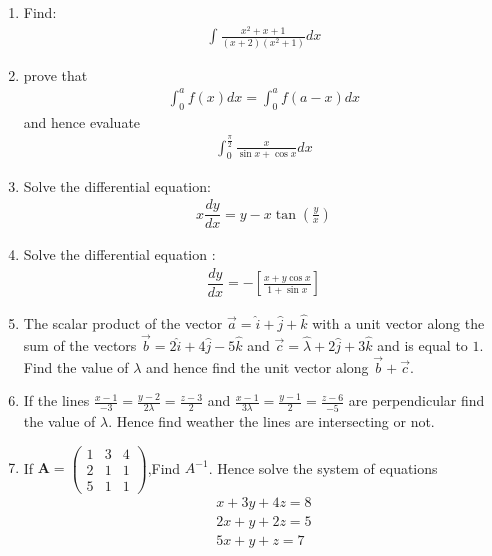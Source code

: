 \documentclass[12pt,-letter paper]{article}
\providecommand{\sbrak}[1]{\ensuremath{{}\left[#1\right]}}
\providecommand{\brak}[1]{\ensuremath{\left(#1\right)}}
\theoremstyle{remark}
\newcommand{\myvec}[1]{\ensuremath{\begin{pmatrix}#1\end{pmatrix}}}
\let\vec\mathbf
\begin{document}
\begin{enumerate}
\item Find: \begin{align*}\int{\frac{x^2+x+1}{\brak{x+2}\brak{x^2+1}}}dx\end{align*}

\item prove that 
\begin{align*}
    \int_{0}^{a} f\brak{x}dx = \int_{0}^{a} f\brak{a-x}dx
\end{align*}
and hence evaluate 
\begin{align*}
\int_{0}^{\frac{\pi}{2}}\frac{x}{{\sin x}+{\cos x}}dx
\end{align*}

\item Solve the differential equation: 
\begin{align*}
{x}\dfrac{dy}{dx}= {y}-{x}\tan\brak{\frac{y}{x}}
\end{align*}

\item Solve the differential equation : 
\begin{align*}
\dfrac{dy}{dx}= -\sbrak{\frac{x+y\cos x}{1+\sin x}}
\end{align*}

\item The scalar product of the vector $\overrightarrow{a} = \hat{i}+\hat{j}+\hat{k}$ with a unit vector along the sum of the vectors $\overrightarrow{b} = 2\hat{i}+4\hat{j}-5\hat{k}$ and $\overrightarrow{c} = \hat{\lambda}+2\hat{j}+3\hat{k}$ and is equal to $1$. Find the value of $\lambda$ and hence find the unit vector along $\overrightarrow{b}+\overrightarrow{c}$.

\item If the lines $\frac{x-1}{-3}=\frac{y-2}{2\lambda}=\frac{z-3}{2}$ and $\frac{x-1}{3\lambda}=\frac{y-1}{2}=\frac{z-6}{-5}$ are perpendicular find the value of $\lambda$. Hence find weather the lines are intersecting or not.

\item If ${\vec{A}} = \myvec{1&3&4\\2&1&1\\5&1&1}$,Find $A^{-1}$.
        Hence solve the system of equations 
            \begin{align*}
                {x+3y+4z}=8 \\
                {2x+y+2z}=5 \\
                {5x+y+z} =7
            \end{align*}    
                

\end{enumerate}
\end{document}
